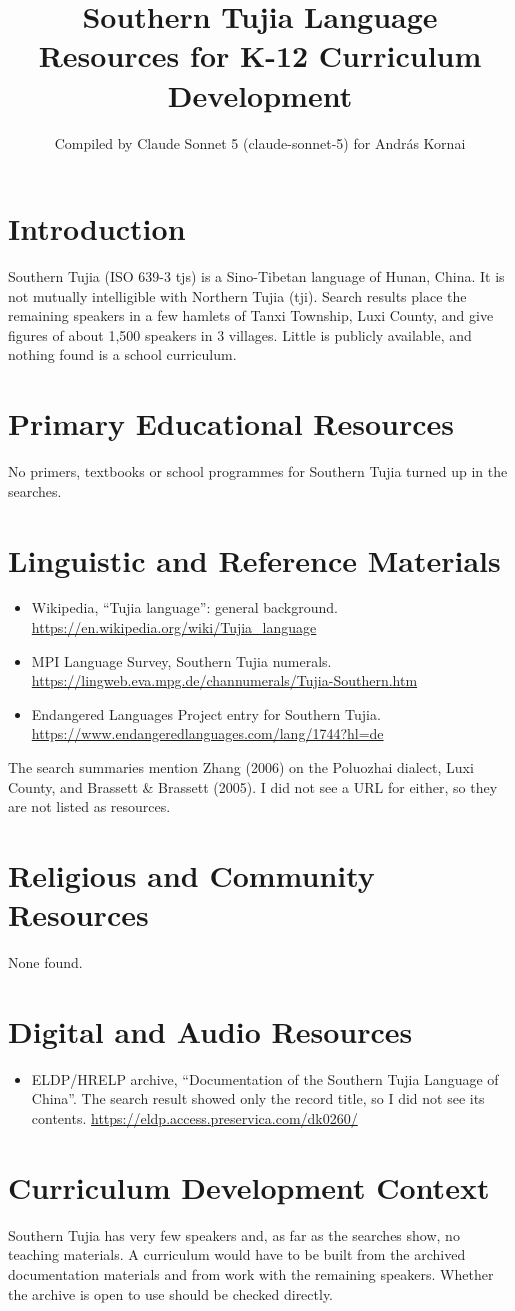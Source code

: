 \documentclass[12pt]{article}
\title{Southern Tujia Language Resources for K-12 Curriculum Development}
\author{Compiled by Claude Sonnet 5 (claude-sonnet-5) for Andr\'as Kornai}
\date{}
\begin{document}
\maketitle
\section{Introduction}
Southern Tujia (ISO 639-3 tjs) is a Sino-Tibetan language of Hunan, China. It is not mutually intelligible with Northern Tujia (tji). Search results place the remaining speakers in a few hamlets of Tanxi Township, Luxi County, and give figures of about 1,500 speakers in 3 villages. Little is publicly available, and nothing found is a school curriculum.
\section{Primary Educational Resources}
No primers, textbooks or school programmes for Southern Tujia turned up in the searches.
\section{Linguistic and Reference Materials}
\begin{itemize}
\item Wikipedia, ``Tujia language'': general background. \url{https://en.wikipedia.org/wiki/Tujia_language}
\item MPI Language Survey, Southern Tujia numerals. \url{https://lingweb.eva.mpg.de/channumerals/Tujia-Southern.htm}
\item Endangered Languages Project entry for Southern Tujia. \url{https://www.endangeredlanguages.com/lang/1744?hl=de}
\end{itemize}
The search summaries mention Zhang (2006) on the Poluozhai dialect, Luxi County, and Brassett \& Brassett (2005). I did not see a URL for either, so they are not listed as resources.
\section{Religious and Community Resources}
None found.
\section{Digital and Audio Resources}
\begin{itemize}
\item ELDP/HRELP archive, ``Documentation of the Southern Tujia Language of China''. The search result showed only the record title, so I did not see its contents. \url{https://eldp.access.preservica.com/dk0260/}
\end{itemize}
\section{Curriculum Development Context}
Southern Tujia has very few speakers and, as far as the searches show, no teaching materials. A curriculum would have to be built from the archived documentation materials and from work with the remaining speakers. Whether the archive is open to use should be checked directly.
\end{document}
